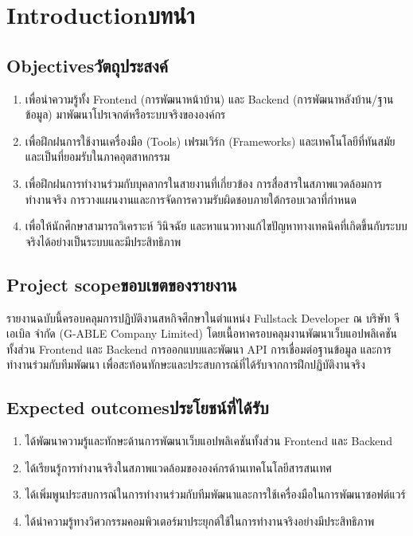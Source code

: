 \chapter{\ifenglish Introduction\else บทนำ\fi}

\section{\ifenglish Objectives\else วัตถุประสงค์\fi}
\begin{enumerate}
    \sloppy
    \item เพื่อนำความรู้ทั้ง Frontend (การพัฒนาหน้าบ้าน) และ Backend (การพัฒนาหลังบ้าน/ฐานข้อมูล) มาพัฒนาโปรเจกต์หรือระบบจริงขององค์กร
    \item เพื่อฝึกฝนการใช้งานเครื่องมือ (Tools) เฟรมเวิร์ก (Frameworks) และเทคโนโลยีที่ทันสมัยและเป็นที่ยอมรับในภาคอุตสาหกรรม
    \item เพื่อฝึกฝนการทำงานร่วมกับบุคลากรในสายงานที่เกี่ยวข้อง การสื่อสารในสภาพแวดล้อมการทำงานจริง การวางแผนงานและการจัดการความรับผิดชอบภายใต้กรอบเวลาที่กำหนด
    \item เพื่อให้นักศึกษาสามารถวิเคราะห์ วินิจฉัย และหาแนวทางแก้ไขปัญหาทางเทคนิคที่เกิดขึ้นกับระบบจริงได้อย่างเป็นระบบและมีประสิทธิภาพ
\end{enumerate}

\section{\ifenglish Project scope\else ขอบเขตของรายงาน\fi}
รายงานฉบับนี้ครอบคลุมการปฏิบัติงานสหกิจศึกษาในตำแหน่ง Fullstack Developer ณ บริษัท จีเอเบิล จำกัด (G-ABLE Company Limited) โดยเนื้อหาครอบคลุมงานพัฒนาเว็บแอปพลิเคชันทั้งส่วน Frontend และ Backend การออกแบบและพัฒนา API การเชื่อมต่อฐานข้อมูล และการทำงานร่วมกับทีมพัฒนา เพื่อสะท้อนทักษะและประสบการณ์ที่ได้รับจากการฝึกปฏิบัติงานจริง

\section{\ifenglish Expected outcomes\else ประโยชน์ที่ได้รับ\fi}
\begin{enumerate}
    \item ได้พัฒนาความรู้และทักษะด้านการพัฒนาเว็บแอปพลิเคชันทั้งส่วน Frontend และ Backend
    \item ได้เรียนรู้การทำงานจริงในสภาพแวดล้อมขององค์กรด้านเทคโนโลยีสารสนเทศ
    \item ได้เพิ่มพูนประสบการณ์ในการทำงานร่วมกับทีมพัฒนาและการใช้เครื่องมือในการพัฒนาซอฟต์แวร์
    \item ได้นำความรู้ทางวิศวกรรมคอมพิวเตอร์มาประยุกต์ใช้ในการทำงานจริงอย่างมีประสิทธิภาพ
\end{enumerate}

